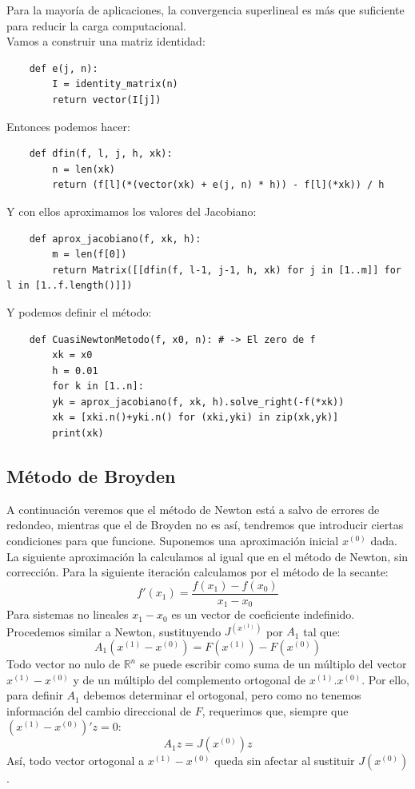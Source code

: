 Para la mayoría de aplicaciones, la convergencia superlineal es más que suficiente para reducir la carga computacional.\\
Vamos a construir una matriz identidad:
\begin{verbatim}
	def e(j, n):
		I = identity_matrix(n)
		return vector(I[j])
\end{verbatim}
Entonces podemos hacer:
\begin{verbatim}
	def dfin(f, l, j, h, xk):
		n = len(xk)
		return (f[l](*(vector(xk) + e(j, n) * h)) - f[l](*xk)) / h
\end{verbatim}
Y con ellos aproximamos los valores del Jacobiano:
\begin{verbatim}
	def aprox_jacobiano(f, xk, h):
		m = len(f[0])
		return Matrix([[dfin(f, l-1, j-1, h, xk) for j in [1..m]] for l in [1..f.length()]])
\end{verbatim}
Y podemos definir el método:
\begin{verbatim}
	def CuasiNewtonMetodo(f, x0, n): # -> El zero de f
		xk = x0
		h = 0.01
		for k in [1..n]:
		yk = aprox_jacobiano(f, xk, h).solve_right(-f(*xk))
		xk = [xki.n()+yki.n() for (xki,yki) in zip(xk,yk)]
		print(xk)
\end{verbatim}


\subsection{Método de Broyden}

A continuación veremos que el método de Newton está a salvo de errores de redondeo, mientras que el de Broyden no es así, tendremos que introducir ciertas condiciones para que funcione. 
Suponemos una aproximación inicial $x^(0)$ dada. La siguiente aproximación la calculamos al igual que en el método de Newton, sin corrección.
Para la siguiente iteración calculamos por el método de la secante:
\[f'(x_1) = \frac{f(x_1)-f(x_0)}{x_1-x_0}\]
Para sistemas no lineales $x_1 - x_0$ es un vector de coeficiente indefinido. Procedemos similar a Newton, sustituyendo $J^(x^{(1)})$ por $A_1$ tal que:
\[A_1(x^{(1)}-x^{(0)}) = F(x^{(1)})-F(x^{(0)})\]
Todo vector no nulo de $\mathbb{R}^n$ se puede escribir como suma de un múltiplo del vector $x^{(1)}-x^{(0)}$ y de un múltiplo del complemento ortogonal de $x^{(1)}.x^{(0)}$. Por ello, para definir $A_1$ debemos determinar el ortogonal, pero como no tenemos información del cambio direccional de $F$, requerimos que, siempre que $(x^{(1)}-x^{(0)})' z = 0$:
\[A_1 z = J(x^{(0)}) z\]
Así, todo vector ortogonal a $x^{(1)}-x^{(0)}$ queda sin afectar al sustituir $J(x^{(0)})$.


